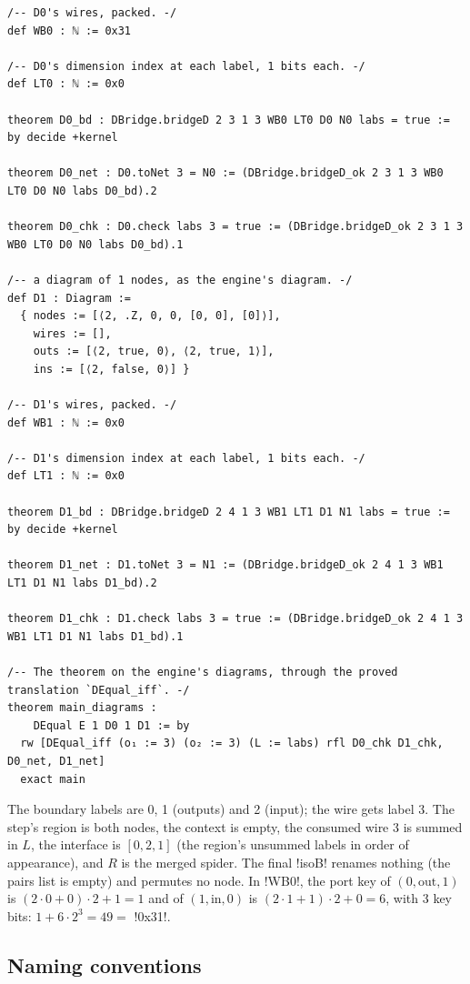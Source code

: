 {\begin{example}
\begin{lstlisting}[style=leannet]
/-- D0's wires, packed. -/
def WB0 : ℕ := 0x31

/-- D0's dimension index at each label, 1 bits each. -/
def LT0 : ℕ := 0x0

theorem D0_bd : DBridge.bridgeD 2 3 1 3 WB0 LT0 D0 N0 labs = true := by decide +kernel

theorem D0_net : D0.toNet 3 = N0 := (DBridge.bridgeD_ok 2 3 1 3 WB0 LT0 D0 N0 labs D0_bd).2

theorem D0_chk : D0.check labs 3 = true := (DBridge.bridgeD_ok 2 3 1 3 WB0 LT0 D0 N0 labs D0_bd).1

/-- a diagram of 1 nodes, as the engine's diagram. -/
def D1 : Diagram :=
  { nodes := [⟨2, .Z, 0, 0, [0, 0], [0]⟩],
    wires := [],
    outs := [⟨2, true, 0⟩, ⟨2, true, 1⟩],
    ins := [⟨2, false, 0⟩] }

/-- D1's wires, packed. -/
def WB1 : ℕ := 0x0

/-- D1's dimension index at each label, 1 bits each. -/
def LT1 : ℕ := 0x0

theorem D1_bd : DBridge.bridgeD 2 4 1 3 WB1 LT1 D1 N1 labs = true := by decide +kernel

theorem D1_net : D1.toNet 3 = N1 := (DBridge.bridgeD_ok 2 4 1 3 WB1 LT1 D1 N1 labs D1_bd).2

theorem D1_chk : D1.check labs 3 = true := (DBridge.bridgeD_ok 2 4 1 3 WB1 LT1 D1 N1 labs D1_bd).1

/-- The theorem on the engine's diagrams, through the proved translation `DEqual_iff`. -/
theorem main_diagrams :
    DEqual E 1 D0 1 D1 := by
  rw [DEqual_iff (o₁ := 3) (o₂ := 3) (L := labs) rfl D0_chk D1_chk, D0_net, D1_net]
  exact main
\end{lstlisting}

The boundary labels are 0, 1 (outputs) and 2 (input); the wire gets label 3. The step's region is
both nodes, the context is empty, the consumed wire 3 is summed in $L$, the interface is
$[0, 2, 1]$ (the region's unsummed labels in order of appearance), and $R$ is the merged spider.
The final \lean!isoB! renames nothing (the pairs list is empty) and permutes no node. In
\code!WB0!, the port key of $(0,\text{out},1)$ is $(2\cdot0+0)\cdot 2+1 = 1$ and of
$(1,\text{in},0)$ is $(2\cdot1+1)\cdot2+0 = 6$, with 3 key bits: $1 + 6\cdot 2^3 = 49 =$
\code!0x31!.
\end{example}

\subsection{Naming conventions}\label{sec:lean-export-net-names}

}
